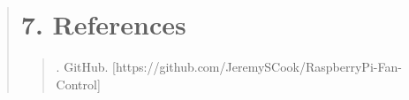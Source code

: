 \documentclass[12pt]{report}
\begin{document}
	\begin{quote}
		\section{7. References}
		\justifying
		\begin{quote}
			. GitHub. [https://github.com/JeremySCook/RaspberryPi-Fan-Control]
			\justifying
			
			
		\end{quote}
	\end{quote}
	
\end{document}
